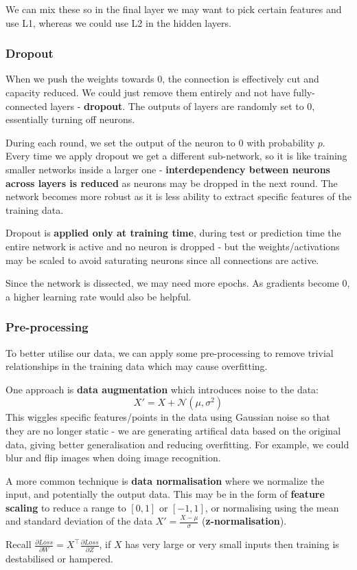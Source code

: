 \documentclass[11pt]{article}
\begin{document}
We can mix these so in the final layer we may want to pick certain features and use L1, whereas we could use L2 in the hidden layers.

\subsubsection{Dropout}
When we push the weights towards 0, the connection is effectively cut and capacity reduced.
We could just remove them entirely and not have fully-connected layers - \textbf{dropout}.
The outputs of layers are randomly set to 0, essentially turning off neurons.

During each round, we set the output of the neuron to 0 with probability $p$.
Every time we apply dropout we get a different sub-network, so it is like training smaller networks inside a larger one - \textbf{interdependency between neurons across layers is reduced} as neurons may be dropped in the next round.
The network becomes more robust as it is less ability to extract specific features of the training data.

Dropout is \textbf{applied only at training time}, during test or prediction time the entire network is active and no neuron is dropped - but the weights/activations may be scaled to avoid saturating neurons since all connections are active.

Since the network is dissected, we may need more epochs.
As gradients become 0, a higher learning rate would also be helpful.

\subsubsection{Pre-processing}
To better utilise our data, we can apply some pre-processing to remove trivial relationships in the training data which may cause overfitting.

One approach is \textbf{data augmentation} which introduces noise to the data:
\[
  X' = X + \mathcal{N}(\mu, \sigma^2) 
\]
This wiggles specific features/points in the data using Gaussian noise so that they are no longer static - we are generating artifical data based on the original data, giving better generalisation and reducing overfitting.
For example, we could blur and flip images when doing image recognition.

A more common technique is \textbf{data normalisation} where we normalize the input, and potentially the output data.
This may be in the form of \textbf{feature scaling} to reduce a range to $[0, 1]$ or $[-1, 1]$, or normalising using the mean and standard deviation of the data $X' = \frac{X - \mu}{\sigma}$ (\textbf{z-normalisation}).

Recall $\frac{\partial Loss}{\partial W} = X^\intercal \frac{\partial Loss}{\partial Z}$, if $X$ has very large or very small inputs then training is destabilised or hampered.
\end{document}
